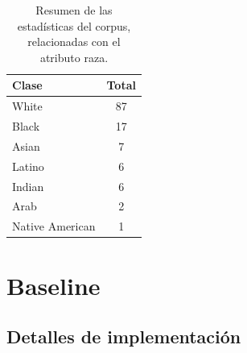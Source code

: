 \begin{table}[htpb]
    \centering
        \begin{tabular}{lc}
        \toprule
            \textbf{Clase} & \textbf{Total} \\
        \midrule
                     White & 87 \\
                     Black & 17 \\
                     Asian & 7 \\
                    Latino & 6 \\
                    Indian & 6 \\
                      Arab & 2 \\
           Native American & 1 \\

        \bottomrule
        \end{tabular}
    \caption{Resumen de las estad\'isticas del corpus, relacionadas con el atributo raza.}
    \label{table:stats_race}
\end{table}

\section{Baseline}

\subsection{Detalles de implementaci\'on}

